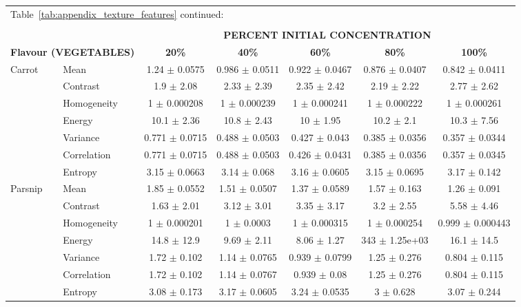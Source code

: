 \documentclass[authoryear]{elsarticle}
\begin{document}
  	\centering
	\begin{tabular}{llccccc}
	\multicolumn{4}{l}{Table~\ref{tab:appendix_texture_features} continued:}\\ 
	\multicolumn{4}{c}{}\\ 
	\toprule
    \multicolumn{1}{r}{} & & \multicolumn{5}{c}{\textbf{PERCENT INITIAL CONCENTRATION}} \\
 \multicolumn{2}{l}{\textbf{Flavour (VEGETABLES)}} & \textbf{20\%} & \textbf{40\%} & \textbf{60\%} & \textbf{80\%} & \textbf{100\%} \\	
	\midrule    
Carrot & Mean & 1.24 $\pm$ 0.0575 & 0.986 $\pm$ 0.0511 & 0.922 $\pm$ 0.0467 & 0.876 $\pm$ 0.0407 & 0.842 $\pm$ 0.0411 \\ 
& Contrast & 1.9 $\pm$ 2.08 & 2.33 $\pm$ 2.39 & 2.35 $\pm$ 2.42 & 2.19 $\pm$ 2.22 & 2.77 $\pm$ 2.62 \\ 
& Homogeneity & 1 $\pm$ 0.000208 & 1 $\pm$ 0.000239 & 1 $\pm$ 0.000241 & 1 $\pm$ 0.000222 & 1 $\pm$ 0.000261 \\ 
& Energy & 10.1 $\pm$ 2.36 & 10.8 $\pm$ 2.43 & 10 $\pm$ 1.95 & 10.2 $\pm$ 2.1 & 10.3 $\pm$ 7.56 \\ 
& Variance & 0.771 $\pm$ 0.0715 & 0.488 $\pm$ 0.0503 & 0.427 $\pm$ 0.043 & 0.385 $\pm$ 0.0356 & 0.357 $\pm$ 0.0344 \\ 
& Correlation & 0.771 $\pm$ 0.0715 & 0.488 $\pm$ 0.0503 & 0.426 $\pm$ 0.0431 & 0.385 $\pm$ 0.0356 & 0.357 $\pm$ 0.0345 \\ 
& Entropy & 3.15 $\pm$ 0.0663 & 3.14 $\pm$ 0.068 & 3.16 $\pm$ 0.0605 & 3.15 $\pm$ 0.0695 & 3.17 $\pm$ 0.142 \\ 
    \midrule   
Parsnip & Mean & 1.85 $\pm$ 0.0552 & 1.51 $\pm$ 0.0507 & 1.37 $\pm$ 0.0589 & 1.57 $\pm$ 0.163 & 1.26 $\pm$ 0.091 \\ 
& Contrast & 1.63 $\pm$ 2.01 & 3.12 $\pm$ 3.01 & 3.35 $\pm$ 3.17 & 3.2 $\pm$ 2.55 & 5.58 $\pm$ 4.46 \\ 
& Homogeneity & 1 $\pm$ 0.000201 & 1 $\pm$ 0.0003 & 1 $\pm$ 0.000315 & 1 $\pm$ 0.000254 & 0.999 $\pm$ 0.000443 \\ 
& Energy & 14.8 $\pm$ 12.9 & 9.69 $\pm$ 2.11 & 8.06 $\pm$ 1.27 & 343 $\pm$ 1.25e+03 & 16.1 $\pm$ 14.5 \\ 
& Variance & 1.72 $\pm$ 0.102 & 1.14 $\pm$ 0.0765 & 0.939 $\pm$ 0.0799 & 1.25 $\pm$ 0.276 & 0.804 $\pm$ 0.115 \\ 
& Correlation & 1.72 $\pm$ 0.102 & 1.14 $\pm$ 0.0767 & 0.939 $\pm$ 0.08 & 1.25 $\pm$ 0.276 & 0.804 $\pm$ 0.115 \\ 
& Entropy & 3.08 $\pm$ 0.173 & 3.17 $\pm$ 0.0605 & 3.24 $\pm$ 0.0535 & 3 $\pm$ 0.628 & 3.07 $\pm$ 0.244 \\ 

\end{tabular}
\end{document}
